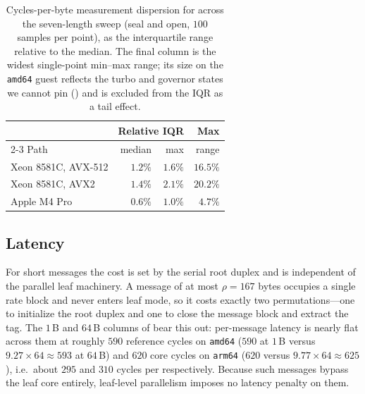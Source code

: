 \begin{table}
\centering
\caption{Cycles-per-byte measurement dispersion for \TW{} across the
seven-length sweep (seal and open, $100$ samples per point), as the
interquartile range relative to the median. The final column is the widest
single-point min--max range; its size on the \texttt{amd64} guest reflects
the turbo and governor states we cannot pin () and
is excluded from the IQR as a tail effect.}
\label{tab:dispersion}
\begin{tabular}{l rrr}
\toprule
& \multicolumn{2}{c}{Relative IQR} & Max \\
\cmidrule(lr){2-3}
Path & median & max & range \\
\midrule
Xeon 8581C, AVX-512 & $1.2\%$ & $1.6\%$ & $16.5\%$ \\
Xeon 8581C, AVX2    & $1.4\%$ & $2.1\%$ & $20.2\%$ \\
Apple M4 Pro        & $0.6\%$ & $1.0\%$ & $\phantom{0}4.7\%$ \\
\bottomrule
\end{tabular}
\end{table}

\subsection{Latency}
\label{sec:latency}

For short messages the cost is set by the serial root duplex and is independent
of the parallel leaf machinery. A message of at most $\rho = 167$ bytes occupies
a single rate block and never enters leaf mode, so it costs exactly two
permutations---one to initialize the root duplex and one to close the message
block and extract the tag. The $1$\,B and $64$\,B columns of  bear
this out: per-message latency is nearly flat across them at roughly $590$
reference cycles on \texttt{amd64} ($590$ at $1$\,B versus $9.27 \times 64
\approx 593$ at $64$\,B) and $620$ core cycles on \texttt{arm64} ($620$ versus
$9.77 \times 64 \approx 625$), i.e.\ about $295$ and $310$ cycles per
\Keccakp{} respectively. Because such messages bypass the leaf
core entirely, leaf-level parallelism imposes no latency penalty on them.

